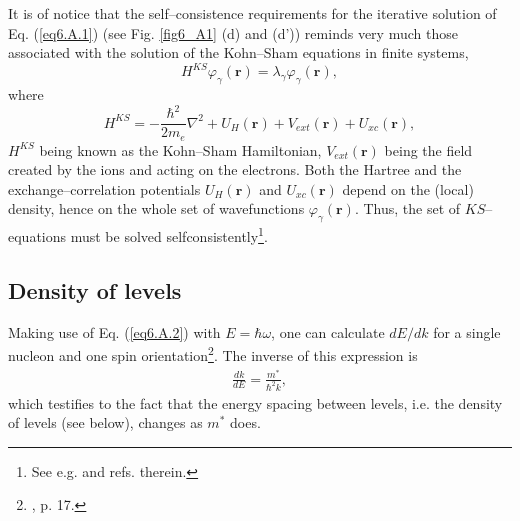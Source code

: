 \begin{subappendices}
It is of notice that the self--consistence requirements for the iterative solution of Eq. (\ref{eq6.A.1}) (see Fig. \ref{fig6_A1} (d) and (d')) reminds very much those associated with the solution of the Kohn--Sham equations in finite systems,
 \begin{equation}
 H^{KS}\varphi_\gamma(\mathbf{r})=\lambda_\gamma\varphi_\gamma(\mathbf{r}),
 \end{equation}
where
 \begin{equation}
 H^{KS}=-\frac{\hbar^2}{2 m_e}\nabla^2+U_H(\mathbf{r})+V_{ext}(\mathbf{r})+U_{xc}(\mathbf{r}),
 \end{equation}
$H^{KS}$ being known as the Kohn--Sham Hamiltonian, $V_{ext}(\mathbf{r})$ being the field created by the ions and acting on the electrons. Both the Hartree and the exchange--correlation potentials $U_H(\mathbf{r})$ and $U_{xc}(\mathbf{r})$ depend on the (local) density, hence on the whole set of wavefunctions $\varphi_\gamma(\mathbf{r})$. Thus, the set of $KS$--equations must be solved selfconsistently\footnote{See e.g. \cite{Broglia:04b} and refs. therein.}.
\subsection{Density of levels}\label{C4AppA1}
Making use of Eq. (\ref{eq6.A.2}) with $E=\hbar\omega$, one can calculate $dE/dk$ for a single nucleon and one spin orientation\footnote{\cite{Mahaux:85}, p. 17.}. The inverse of this expression is
\begin{align}
\frac{dk}{dE}=\frac{m^*}{\hbar^2k},
\end{align} 
which testifies to the fact that the energy spacing between levels, i.e. the density of levels (see below), changes as $m^*$ does.


\end{subappendices}
